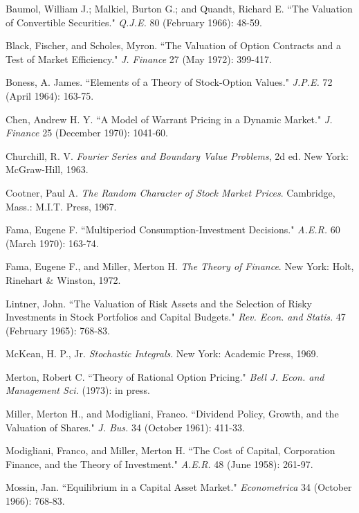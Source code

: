 \documentclass[a4paper, 12pt, twoside]{article}
\begin{document}
\hangindent 5mm
\noindent Baumol, William J.; Malkiel, Burton G.; and Quandt, Richard E. ``The Valuation of 
Convertible Securities." \textit{Q.J.E.} 80 (February 1966): 48-59.

\hangindent 5mm
\noindent Black, Fischer, and Scholes, Myron. ``The Valuation of Option Contracts and a Test of 
Market Efficiency." \textit{J. Finance} 27 (May 1972): 399-417.

\hangindent 5mm
\noindent Boness, A. James. ``Elements of a Theory of Stock-Option Values." \textit{J.P.E.} 72 (April 
1964): 163-75.

\hangindent 5mm
\noindent Chen, Andrew H. Y. ``A Model of Warrant Pricing in a Dynamic Market." \textit{J. Finance} 25 
(December 1970): 1041-60.

\hangindent 5mm
\noindent Churchill, R. V. \textit{Fourier Series and Boundary Value Problems}, 2d ed. New York:   
McGraw-Hill, 1963.

\hangindent 5mm
\noindent Cootner, Paul A. \textit{The Random Character of Stock Market Prices}. Cambridge, Mass.: M.I.T. 
Press, 1967.

\hangindent 5mm
\noindent Fama, Eugene F. ``Multiperiod Consumption-Investment Decisions." \textit{A.E.R.} 60 (March 
1970): 163-74.

\hangindent 5mm
\noindent Fama, Eugene F., and Miller, Merton H. \textit{The Theory of Finance}. New York: Holt, Rinehart 
\& Winston, 1972.

\hangindent 5mm
\noindent Lintner, John. ``The Valuation of Risk Assets and the Selection of Risky Investments in 
Stock Portfolios and Capital Budgets." \textit{Rev. Econ. and Statis.} 47 (February 1965): 768-83.

\hangindent 5mm
\noindent McKean, H. P., Jr. \textit{Stochastic Integrals}. New York: Academic Press, 1969.

\hangindent 5mm
\noindent Merton, Robert C. ``Theory of Rational Option Pricing." \textit{Bell J. Econ. and Management  
Sci.} (1973): in press.

\hangindent 5mm
\noindent Miller, Merton H., and Modigliani, Franco. ``Dividend Policy, Growth, and the Valuation 
of Shares." \textit{J. Bus.} 34 (October 1961): 411-33.

\hangindent 5mm
\noindent Modigliani, Franco, and Miller, Merton H. ``The Cost of Capital, Corporation Finance, 
and the Theory of Investment." \textit{A.E.R.} 48 (June 1958): 261-97. 

\hangindent 5mm
\noindent Mossin, Jan. ``Equilibrium in a Capital Asset Market." \textit{Econometrica} 34 (October 1966): 
768-83.
\end{document}
